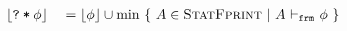 
\begin{align*}
& \staticFP {\withqm{\phi}} &  & = \staticFP{\phi} \cup \min~ \{~ A \in \setSFootprint ~|~ A \sfrmphi \phi ~\} \\
\end{align*}